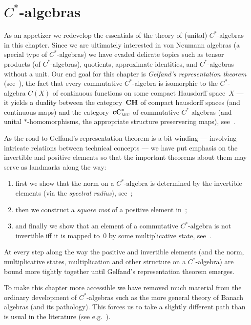 \documentclass[main]{subfiles}
\begin{document}
\chapter{$C^*$-algebras}
As an appetizer
we redevelop the essentials of the theory of (unital) $C^*$-algebras
in this chapter.
Since we are ultimately interested
in von Neumann algebras
(a special type of $C^*$-algebras)
we have evaded
delicate
topics such as tensor products (of $C^*$-algebras), 
quotients, approximate identities,
and $C^*$-algebras without a unit.
Our end goal
for this chapter
is \emph{Gelfand's representation theorem} (see~),
the fact that every commutative $C^*$-algebra
is isomorphic
to the $C^*$-algebra
$C(X)$ of continuous functions on some compact Hausdorff space~$X$
--- it yields a duality
between the category~$\mathbf{CH}$ of compact hausdorff spaces (and continuous maps)
and the category~$\mathbf{cC}^*_{\text{\textsc{miu}}}$ of commutative $C^*$-algebras (and
unital $*$-homomorphisms,
the appropriate structure preservering maps), see~.

As the road to Gelfand's representation theorem 
is a bit winding ---
involving intricate relations between technical concepts --- 
we have put emphasis on the invertible and  positive elements
so that the important
theorems about them may serve as landmarks along the way:
\begin{enumerate}
\item
first we show that the norm
on a $C^*$-algebra
is determined by the invertible elements
(via the \emph{spectral radius}), see~;

\item
then we construct a \emph{square root} of a positive element in~;

\item
and finally we
show that an element of a commutative $C^*$-algebra
is not invertible iff it is mapped to~$0$
by some multiplicative state, see~.
\end{enumerate}
At every step along the way
the positive and invertible elements 
(and the norm, multiplicative states, multiplication
and other structure on a $C^*$-algebra)
are bound more tightly together
until Gelfand's representation theorem emerges.

To make this chapter
more accessible
we have removed
much material
from the ordinary development
of $C^*$-algebras
such as the more general theory of Banach algebras
(and its pathology).
This forces us
to take a slightly different path than is usual in the literature 
(see e.g.~).
\end{document}
